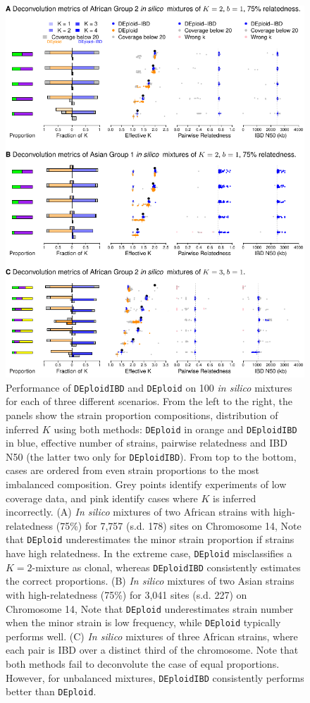 \documentclass[9pt,lineno]{elife}
\begin{document}
\begin{figure}[htp]
  \begin{center}
  \includegraphics[width=.9\textwidth]{Fig2.pdf}
  \caption{Performance of \texttt{DEploidIBD} and \texttt{DEploid} on 100 {\it in silico} mixtures for each of three different scenarios. From the left to the right, the panels show the strain proportion compositions, distribution of inferred $K$ using both methods: {\tt DEploid} in orange and {\tt DEploidIBD} in blue, effective number of strains, pairwise relatedness and IBD N50 (the latter two only for {\tt DEploidIBD}). From top to the bottom, cases are ordered from even strain proportions to the most imbalanced composition. Grey points identify experiments of low coverage data, and pink identify cases where $K$ is inferred incorrectly. (A) {\it In silico}  mixtures of two African strains with high-relatedness (75\%) for 7,757 (s.d. 178) sites on Chromosome 14, Note that {\tt DEploid} underestimates the minor strain proportion if strains have high relatedness. In the extreme case, {\tt DEploid} misclassifies a $K=2$-mixture as clonal, whereas {\tt DEploidIBD} consistently estimates the correct proportions. (B)  {\it In silico}  mixtures of two Asian strains with high-relatedness (75\%) for 3,041 sites (s.d. 227) on Chromosome 14, Note that {\tt DEploid} underestimates strain number when the minor strain is low frequency, while  {\tt DEploid} typically performs well. (C)  {\it In silico} mixtures of three African strains, where each pair is IBD over a distinct third of the chromosome. Note that both methods fail to deconvolute the case of equal proportions. However, for unbalanced mixtures, {\tt DEploidIBD} consistently performs better than {\tt DEploid}.
  }\label{fig:benchmark}
  \end{center}

\setcounter{fig2Counter}{\value{enumi}}
\end{figure}
\end{document}
